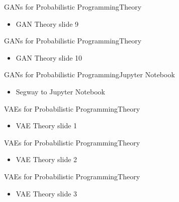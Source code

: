 \documentclass[AERbeamer%
              ,optEnglish%
              ,optBiber%
              ,optBibstyleAlphabetic%
              ,optBeamerClassicFormat%
              ]{AERlatex}%
\begin{document}
\begin{frame}[c]{GANs for Probabilistic Programming}{Theory}
    \centering
    \begin{itemize}
        \item GAN Theory slide 9
    \end{itemize}
\end{frame}


\begin{frame}[c]{GANs for Probabilistic Programming}{Theory}
    \centering
    \begin{itemize}
        \item GAN Theory slide 10
    \end{itemize}
\end{frame}


\begin{frame}[c]{GANs for Probabilistic Programming}{Jupyter Notebook}
    \centering
    \begin{itemize}
        \item Segway to Jupyter Notebook
    \end{itemize}
\end{frame}



\begin{frame}[c]{VAEs for Probabilistic Programming}{Theory}
    \centering
    \begin{itemize}
        \item VAE Theory slide 1
    \end{itemize}
\end{frame}


\begin{frame}[c]{VAEs for Probabilistic Programming}{Theory}
    \centering
    \begin{itemize}
        \item VAE Theory slide 2
    \end{itemize}
\end{frame}


\begin{frame}[c]{VAEs for Probabilistic Programming}{Theory}
    \centering
    \begin{itemize}
        \item VAE Theory slide 3
    \end{itemize}
\end{frame}
\end{document}
